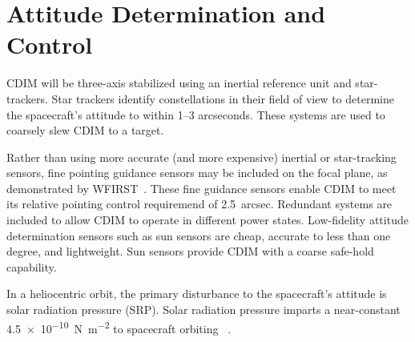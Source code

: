 \documentclass{ws-jai}
\begin{document}



\section{Attitude Determination and Control}
\label{sec:adcs}
CDIM will be three-axis stabilized using an inertial reference unit and star-trackers.
Star trackers identify constellations in their field of view to determine the spacecraft's attitude to within 1--3 arcseconds.
These systems are used to coarsely slew CDIM to a target.

Rather than using more accurate (and more expensive) inertial or star-tracking sensors, fine pointing guidance sensors may be included on the focal plane, as demonstrated by WFIRST~\cite{wfirstFinal2012}.
These fine guidance sensors enable CDIM to meet its relative pointing control requiremend of \SI{2.5}{arcsec}.
Redundant systems are included to allow CDIM to operate in different power states.
Low-fidelity attitude determination sensors such as sun sensors are cheap, accurate to less than one degree, and lightweight.
Sun sensors provide CDIM with a coarse safe-hold capability.

In a heliocentric orbit, the primary disturbance to the spacecraft's attitude is solar radiation pressure (SRP).
Solar radiation pressure imparts a near-constant \SI{4.5e-10}{\newton\per\meter\squared} to spacecraft orbiting \Ltwo~\cite{evans2002natural}.
\end{document}
